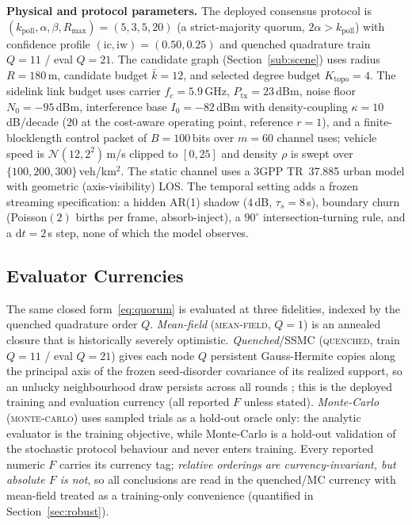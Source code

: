 \documentclass[journal]{IEEEtran}
\newcommand{\qq}{\textsc{quenched}}
\newcommand{\mf}{\textsc{mean-field}}
\newcommand{\mc}{\textsc{monte-carlo}}
\newcommand{\kcand}{\ensuremath{\bar k}}                 %
\newcommand{\Ktopo}{\ensuremath{K_{\mathrm{topo}}}}      %
\newcommand{\kpoll}{\ensuremath{k_{\mathrm{poll}}}}      %
\begin{document}
\textbf{Physical and protocol parameters.} The deployed consensus protocol is
$(\kpoll,\alpha,\beta,R_{\max})=(5,3,5,20)$ (a strict-majority quorum,
$2\alpha>\kpoll$) with confidence profile $(\mathrm{ic},\mathrm{iw})=(0.50,0.25)$
and quenched quadrature train $Q{=}11$ / eval $Q{=}21$. The candidate graph
(Section~\ref{sub:scene}) uses radius $R{=}180$\,m, candidate budget
$\kcand{=}12$, and selected degree budget $\Ktopo{=}4$. The sidelink link budget
uses carrier $f_c{=}5.9$\,GHz, $P_{\mathrm{tx}}{=}23$\,dBm, noise floor
$N_0{=}{-}95$\,dBm, interference base $I_0{=}{-}82$\,dBm with density-coupling
$\kappa{=}10$\,dB/decade ($20$ at the cost-aware operating point, reference
$r{=}1$), and a finite-blocklength control packet of $B{=}100$\,bits over
$m{=}60$ channel uses; vehicle speed is $\mathcal{N}(12,2^2)$\,m/s clipped to
$[0,25]$ and density $\rho$ is swept over $\{100,200,300\}$\,veh/km$^2$. The
static channel uses a 3GPP TR~37.885 \cite{PLACEHOLDER_3gpp_37885} urban model
with geometric (axis-visibility) LOS. The temporal setting adds a frozen
streaming specification: a hidden AR(1) shadow ($4$\,dB, $\tau_s{=}8$\,s), boundary
churn (Poisson$(2)$ births per frame, absorb-inject), a $90^\circ$
intersection-turning rule, and a $\mathrm{d}t{=}2$\,s step, none of which the
model observes.

\subsection{Evaluator Currencies}\label{sub:currency}

The same closed form~\eqref{eq:quorum} is evaluated at three fidelities, indexed
by the quenched quadrature order $Q$. \emph{Mean-field} (\mf{}, $Q{=}1$) is an
annealed closure that is historically severely optimistic. \emph{Quenched}/SSMC
(\qq{}, train $Q{=}11$ / eval $Q{=}21$) gives each node $Q$ persistent
Gauss-Hermite \cite{PLACEHOLDER_gauss_hermite} copies along the principal axis of
the frozen seed-disorder covariance of its realized support, so an unlucky
neighbourhood draw persists across all rounds
\cite{PLACEHOLDER_quenched_disorder}; this is the deployed training and
evaluation currency (all reported $F$ unless stated). \emph{Monte-Carlo} (\mc{})
uses sampled trials as a hold-out oracle only: the analytic evaluator is the
training objective, while Monte-Carlo is a hold-out validation of the stochastic
protocol behaviour and never enters training. Every reported numeric $F$ carries
its currency tag; \emph{relative orderings are currency-invariant, but absolute
$F$ is not}, so all conclusions are read in the quenched/MC currency with
mean-field treated as a training-only convenience (quantified in
Section~\ref{sec:robust}).
\end{document}
